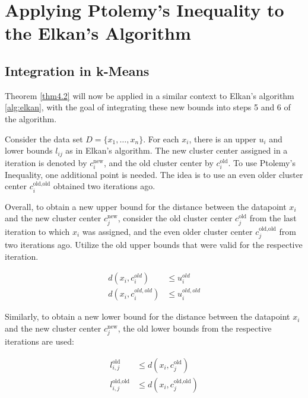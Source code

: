 \section{Applying Ptolemy's Inequality to the Elkan's Algorithm}




\subsection{Integration in k-Means}
Theorem \ref{thm4.2} will now be applied in a similar context to Elkan's algorithm \ref{alg:elkan}, with the goal of integrating these new bounds into steps 5 and 6 of the algorithm.

Consider the data set \(D = \{x_1, \ldots, x_n\}\). For each \(x_i\), there is an upper \(u_i\) and lower bounds \(l_{ij}\) as in Elkan's algorithm. The new cluster center assigned in a iteration is denoted by \(c_i^{\text{new}}\), and the old cluster center by \(c_i^{\text{old}}\). To use Ptolemy's Inequality, one additional point is needed. The idea is to use an even older cluster center \(c_i^{\text{old,old}}\) obtained two iterations ago.

Overall, to obtain a new upper bound for the distance between the datapoint \(x_i\) and the new cluster center \(c_j^{\text{new}}\), consider the old cluster center \(c_j^{\text{old}}\) from the last iteration to which \(x_i\) was assigned, and the even older cluster center \(c_j^{\text{old,old}}\) from two iterations ago. Utilize the old upper bounds that were valid for the respective iteration.

\begin{equation*}
	\begin{aligned}
		d(x_i,c_i^{old})      & \leq u_i^{old}      \\
		d(x_i,c_i^{old, old}) & \leq u_i^{old, old}
	\end{aligned}
\end{equation*}

Similarly, to obtain a new lower bound for the distance between the datapoint \(x_i\) and the new cluster center \(c_j^{\text{new}}\), the old lower bounds from the respective iterations are used:

\begin{equation*}
	\begin{aligned}
		l_{i,j}^{\text{old}}     & \leq d(x_i, c_j^{\text{old}})     \\
		l_{i,j}^{\text{old,old}} & \leq d(x_i, c_j^{\text{old,old}})
	\end{aligned}
\end{equation*}


